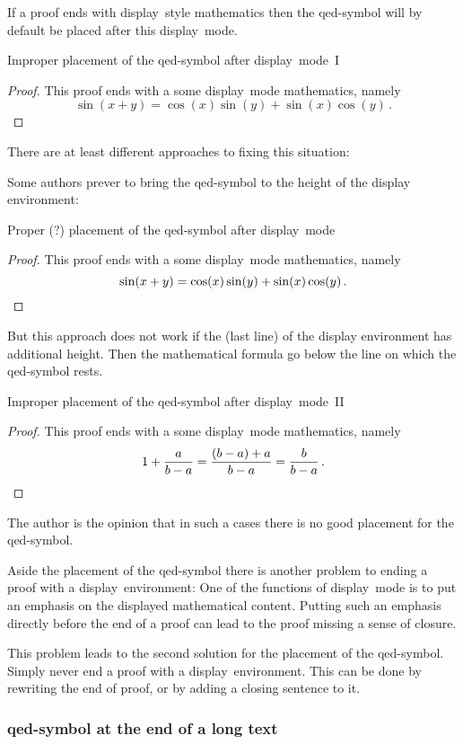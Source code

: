 If a proof ends with display~style mathematics then the qed-symbol will by default be placed after this display~mode.
\begin{showlatex}{Improper placement of the qed-symbol after display~mode~I}
\begin{proof}
  This proof ends with a some display~mode mathematics, namely
  \[
    \sin(x+y)
    =
    \cos(x)\sin(y) + \sin(x)\cos(y) \,.
  \]
\end{proof}
\end{showlatex}
There are at least different approaches to fixing this situation:

Some authors prever to bring the qed-symbol to the height of the display environment:
\begin{showlatex}{Proper (?) placement of the qed-symbol after display~mode}
\begin{proof}
  This proof ends with a some display~mode mathematics, namely
  \[
    \sin(x+y)
    =
    \cos(x)\sin(y) + \sin(x)\cos(y) \,.
    \qedhere
  \]
\end{proof}
\end{showlatex}
But this approach does not work if the (last line) of the display environment has additional height.
Then the mathematical formula go below the line on which the qed-symbol rests.
\begin{showlatex}{Improper placement of the qed-symbol after display~mode~II}
\begin{proof}
  This proof ends with a some display~mode mathematics, namely
  \[
    1
    + \frac{a}{b - a}
    =
    \frac{(b - a) + a}{b - a}
    =
    \frac{b}{b - a} \,.
    \qedhere
  \]
\end{proof}
\end{showlatex}
The author is the opinion that in such a cases there is no good placement for the qed-symbol.

Aside the placement of the qed-symbol there is another problem to ending a proof with a display~environment:
One of the functions of display~mode is to put an emphasis on the displayed mathematical content.
Putting such an emphasis directly before the end of a proof can lead to the proof missing a sense of closure.

This problem leads to the second solution for the placement of the qed-symbol.
Simply never end a proof with a display~environment.
This can be done by rewriting the end of proof, or by adding a closing sentence to it.

\subsubsection{qed-symbol at the end of a long text}

